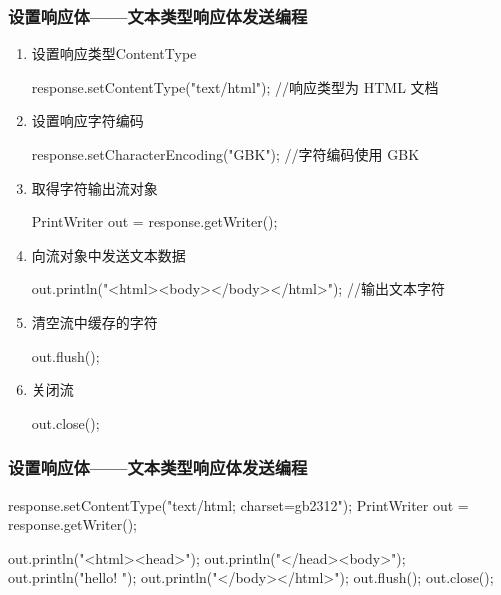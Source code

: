 \begin{frame}[fragile] %
\frametitle{设置响应体——文本类型响应体发送编程}
\begin{enumerate}
\item 设置响应类型ContentType
\begin{javaCode}
response.setContentType("text/html"); //响应类型为 HTML 文档    
\end{javaCode}
\item 设置响应字符编码
\begin{javaCode}
response.setCharacterEncoding("GBK"); //字符编码使用 GBK
\end{javaCode}
\item 取得字符输出流对象
\begin{javaCode}
PrintWriter out = response.getWriter();
\end{javaCode}
\item 向流对象中发送文本数据
\begin{javaCode}
out.println("<html><body></body></html>"); //输出文本字符
\end{javaCode}
\item 清空流中缓存的字符
\begin{javaCode}
out.flush();
\end{javaCode}
\item 关闭流
\begin{javaCode}
out.close();
\end{javaCode}
\end{enumerate}
\end{frame}

\begin{frame}[fragile] %
\frametitle{设置响应体——文本类型响应体发送编程}


\begin{javaCode}
response.setContentType("text/html; charset=gb2312");
PrintWriter out = response.getWriter();

out.println("<html><head>");
out.println("</head><body>");
out.println("hello! ");
out.println("</body></html>");
out.flush();
out.close();
\end{javaCode} 

\end{frame}

